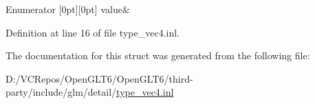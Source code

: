 \begin{DoxyEnumFields}{Enumerator}
[0pt][0pt]{}\mbox{\label{structglm_1_1detail_1_1is__int_3_01uint32_01_4_a8930e3fe143b2eb718be340178475095a33d5c966994a88b96988fb1085e9530c}} 
value&\\
\hline

\end{DoxyEnumFields}


Definition at line 16 of file type\+\_\+vec4.\+inl.



The documentation for this struct was generated from the following file\+:\begin{DoxyCompactItemize}
\item 
D\+:/\+V\+C\+Repos/\+Open\+G\+L\+T6/\+Open\+G\+L\+T6/third-\/party/include/glm/detail/\mbox{\hyperlink{type__vec4_8inl}{type\+\_\+vec4.\+inl}}\end{DoxyCompactItemize}

